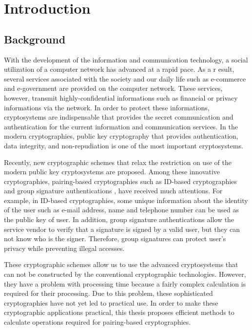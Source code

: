 
\chapter{Introduction}
\label{chapter1}
\section{Background}



With  the development of the information and communication technology, a social utilization of a computer network has advanced at a rapid pace.
As a r esult, several services associated with the society and our daily life such as e-commerce and e-government are provided on the computer network.
These services, however, transmit highly-confidential informations such as financial or privacy informations via the network.
In order to protect these informations, cryptosystems are indispensable that provides the secret communication and authentication for the current information and communication services.
In the modern cryptographies, public key cryptography that provides authentication, data integrity, and non-repudiation is one of the most important cryptosystems.

Recently, new cryptographic schemes that relax the restriction on use of the modern public key cryptosystems are proposed.
Among these innovative cryptographies, pairing-based cryptographies such as ID-based cryptographies\cite{ID} and group signature authentications \cite{BBS}, \cite{nakanisi} have received much attentions.
For example, in ID-based cryptographies, some unique information about the identity of the user such as e-mail address, name and telephone number can be used as the public key of user.
In addition, group signature authentications allow the service vendor to verify that a signature is signed by a valid user, but they can not know who is the signer.
Therefore, group signatures can protect user's privacy while preventing illegal accesses.

These cryptographic schemes allow us to use the advanced cryptosystems that can not be constructed by the conventional cryptographic technologies.
However, they have a problem with processing time because a fairly complex calculation is required for their processing.  
Due to this problem, these sophisticated cryptographies have not yet led to practical use.   
In order to make these cryptographic applications practical, this thesis proposes efficient methods to calculate operations required for pairing-based cryptographies.

